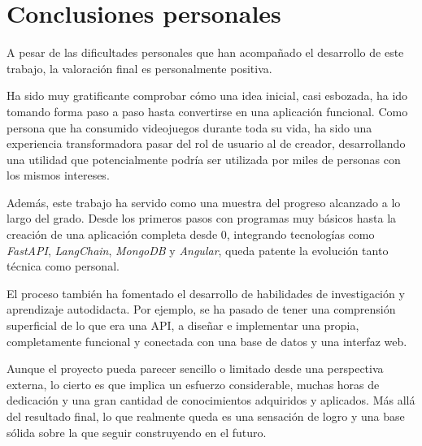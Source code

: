 \newpage
\section{Conclusiones personales}

A pesar de las dificultades personales que han acompañado el desarrollo de este trabajo, la valoración final es personalmente positiva.

Ha sido muy gratificante comprobar cómo una idea inicial, casi esbozada, ha ido tomando forma paso a paso hasta convertirse en una aplicación funcional. Como persona que ha consumido videojuegos durante toda su vida, ha sido una experiencia transformadora pasar del rol de usuario al de creador, desarrollando una utilidad que potencialmente podría ser utilizada por miles de personas con los mismos intereses.

Además, este trabajo ha servido como una muestra del progreso alcanzado a lo largo del grado. Desde los primeros pasos con programas muy básicos hasta la creación de una aplicación completa desde 0, integrando tecnologías como \textit{FastAPI}, \textit{LangChain}, \textit{MongoDB} y \textit{Angular}, queda patente la evolución tanto técnica como personal.

El proceso también ha fomentado el desarrollo de habilidades de investigación y aprendizaje autodidacta. Por ejemplo, se ha pasado de tener una comprensión superficial de lo que era una API, a diseñar e implementar una propia, completamente funcional y conectada con una base de datos y una interfaz web.

Aunque el proyecto pueda parecer sencillo o limitado desde una perspectiva externa, lo cierto es que implica un esfuerzo considerable, muchas horas de dedicación y una gran cantidad de conocimientos adquiridos y aplicados. Más allá del resultado final, lo que realmente queda es una sensación de logro y una base sólida sobre la que seguir construyendo en el futuro.

